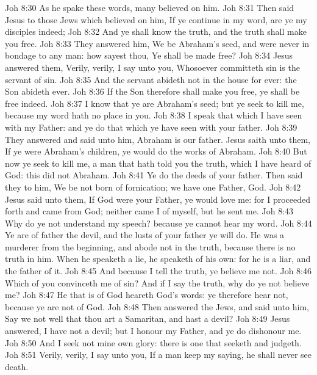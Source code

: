 \vs Joh 8:30 As he spake these words, many believed on him.
\vs Joh 8:31 Then said Jesus to those Jews which believed on him, If ye continue in my word,  are ye my disciples indeed;
\vs Joh 8:32 And ye shall know the truth, and the truth shall make you free.
\vs Joh 8:33 They answered him, We be Abraham's seed, and were never in bondage to any man: how sayest thou, Ye shall be made free?
\vs Joh 8:34 Jesus answered them, Verily, verily, I say unto you, Whosoever committeth sin is the servant of sin.
\vs Joh 8:35 And the servant abideth not in the house for ever:  the Son abideth ever.
\vs Joh 8:36 If the Son therefore shall make you free, ye shall be free indeed.
\vs Joh 8:37 I know that ye are Abraham's seed; but ye seek to kill me, because my word hath no place in you.
\vs Joh 8:38 I speak that which I have seen with my Father: and ye do that which ye have seen with your father.
\vs Joh 8:39 They answered and said unto him, Abraham is our father. Jesus saith unto them, If ye were Abraham's children, ye would do the works of Abraham.
\vs Joh 8:40 But now ye seek to kill me, a man that hath told you the truth, which I have heard of God: this did not Abraham.
\vs Joh 8:41 Ye do the deeds of your father. Then said they to him, We be not born of fornication; we have one Father,  God.
\vs Joh 8:42 Jesus said unto them, If God were your Father, ye would love me: for I proceeded forth and came from God; neither came I of myself, but he sent me.
\vs Joh 8:43 Why do ye not understand my speech?  because ye cannot hear my word.
\vs Joh 8:44 Ye are of  father the devil, and the lusts of your father ye will do. He was a murderer from the beginning, and abode not in the truth, because there is no truth in him. When he speaketh a lie, he speaketh of his own: for he is a liar, and the father of it.
\vs Joh 8:45 And because I tell  the truth, ye believe me not.
\vs Joh 8:46 Which of you convinceth me of sin? And if I say the truth, why do ye not believe me?
\vs Joh 8:47 He that is of God heareth God's words: ye therefore hear  not, because ye are not of God.
\vs Joh 8:48 Then answered the Jews, and said unto him, Say we not well that thou art a Samaritan, and hast a devil?
\vs Joh 8:49 Jesus answered, I have not a devil; but I honour my Father, and ye do dishonour me.
\vs Joh 8:50 And I seek not mine own glory: there is one that seeketh and judgeth.
\vs Joh 8:51 Verily, verily, I say unto you, If a man keep my saying, he shall never see death.
